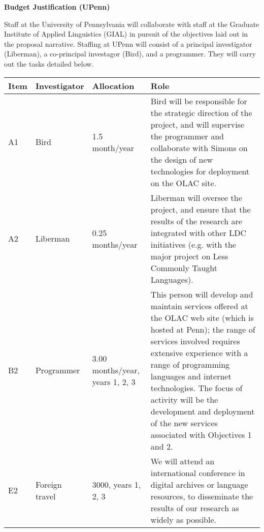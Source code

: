 \documentclass[11pt]{nsf}
\begin{document}
\begin{center}\textbf{\Large
Budget Justification (UPenn)
}\end{center}

Staff at the University of Pennsylvania will collaborate with staff at
the Graduate Institute of Applied Linguistics (GIAL) in pursuit of
the objectives laid out in the proposal narrative.
Staffing at UPenn will consist of a principal investigator (Liberman),
a co-principal investagor (Bird), and a programmer.  They will carry
out the tasks detailed below.

\vspace{1ex}

{\small\noindent
\begin{tabular}{lllp{3in}}
\textbf{Item} &
\textbf{Investigator} & \textbf{Allocation} & \textbf{Role} \\ \hline

A1 & Bird & 1.5 month/year &
Bird will be responsible for the strategic direction of the project,
and will supervise the programmer and collaborate with Simons on the
design of new technologies for deployment on the OLAC site.\\

A2 & Liberman & 0.25 months/year &
Liberman will oversee the project, and ensure that the results of the
research are integrated with other LDC initiatives (e.g. with the
major project on Less Commonly Taught Languages).\\

B2 & Programmer & 3.00 months/year, years 1, 2, 3 &
This person will develop and maintain services offered at the
OLAC web site (which is hosted at Penn); the range of services
involved requires extensive experience with
a range of programming languages and internet technologies.
The focus of activity will be the development and deployment
of the new services associated with Objectives 1 and 2.\\

E2 & Foreign travel & 3000, years 1, 2, 3 &
We will attend an international conference in digital archives or
language resources, to disseminate the results of our research as
widely as possible. \\

\end{tabular}}
\end{document}
